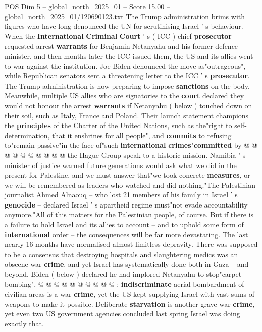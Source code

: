\begin{textsample}{POS Dim 5 – global\_north\_2025\_01 – Score 15.00 – global\_north\_2025\_01/120690123.txt}  \label{ex:f5_pos_270}
The Trump administration brims with figures who have long denounced the UN for scrutinising Israel ' s behaviour.
When the \textbf{International} \textbf{Criminal} \textbf{Court} ' s ( ICC ) chief \textbf{prosecutor} requested arrest \textbf{warrants} for Benjamin Netanyahu and his former defence minister, and then months later the ICC issued them, the US and its allies went to war against the institution.
Joe Biden denounced the move as"outrageous", while Republican senators sent a threatening letter to the ICC ' s \textbf{prosecutor}.
The Trump administration is now preparing to impose \textbf{sanctions} on the body.
Meanwhile, multiple US allies who are signatories to the \textbf{court} declared they would not honour the arrest \textbf{warrants} if Netanyahu ( below ) touched down on their soil, such as Italy, France and Poland.
Their launch statement champions the \textbf{principles} of the Charter of the United Nations, such as the"right to self-determination, that it enshrines for all people", and \textbf{commits} to refusing to"remain passive"in the face of"such \textbf{international} \textbf{crimes}"\textbf{committed} by @ @ @ @ @ @ @ @ @ @ the Hague Group speak to a historic mission.
Namibia ' s minister of justice warned future generations would ask what we did in the present for Palestine, and we must answer that"we took concrete \textbf{measures}, or we will be remembered as leaders who watched and did nothing."The Palestinian journalist Ahmed Alnaouq -- who lost 21 members of his family in Israel ' s \textbf{genocide} -- declared Israel ' s apartheid regime must"not evade accountability anymore."All of this matters for the Palestinian people, of course.
But if there is a failure to hold Israel and its allies to account -- and to uphold some form of \textbf{international} order -- the consequences will be far more devastating.
The last nearly 16 months have normalised almost limitless depravity.
There was supposed to be a consensus that destroying hospitals and slaughtering medics was an obscene war \textbf{crime}, and yet Israel has systematically done both in Gaza -- and beyond.
Biden ( below ) declared he had implored Netanyahu to stop"carpet bombing", @ @ @ @ @ @ @ @ @ @ : \textbf{indiscriminate} aerial bombardment of civilian areas is a war \textbf{crime}, yet the US kept supplying Israel with vast sums of weapons to make it possible.
Deliberate \textbf{starvation} is another grave war \textbf{crime}, yet even two US government agencies concluded last spring Israel was doing exactly that.

\end{textsample}
